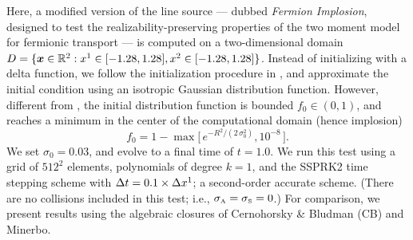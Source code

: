Here, a modified version of the line source --- dubbed \emph{Fermion Implosion},  designed to test the realizability-preserving properties of the two moment model for fermionic transport --- is computed on a two-dimensional domain $D=\{\boldsymbol{x}\in\mathbb{R}^{2}:x^{1}\in[-1.28,1.28], x^{2}\in[-1.28,1.28]\}$.  
Instead of initializing with a delta function, we follow the initialization procedure in \cite{garrettHauck_2013}, and approximate the initial condition using an isotropic Gaussian distribution function.  
However, different from \cite{garrettHauck_2013}, the initial distribution function is bounded $f_{0}\in(0,1)$, and reaches a minimum in the center of the computational domain (hence implosion)
\begin{equation}
  f_{0}
  =1-\max\Big[\,e^{-R^{2}/(2\,\sigma_{0}^{2})},10^{-8}\,\Big].  
\end{equation}
We set $\sigma_{0}=0.03$, and evolve to a final time of $t=1.0$.  
We run this test using a grid of $512^{2}$ elements, polynomials of degree $k=1$, and the SSPRK2 time stepping scheme with $\Delta t=0.1\times\Delta x^{1}$; a second-order accurate scheme.  
(There are no collisions included in this test; i.e., $\sigma_{\mbox{\tiny A}}=\sigma_{\mbox{\tiny S}}=0$.)  
For comparison, we present results using the algebraic closures of Cernohorsky \& Bludman (CB) and Minerbo.  

